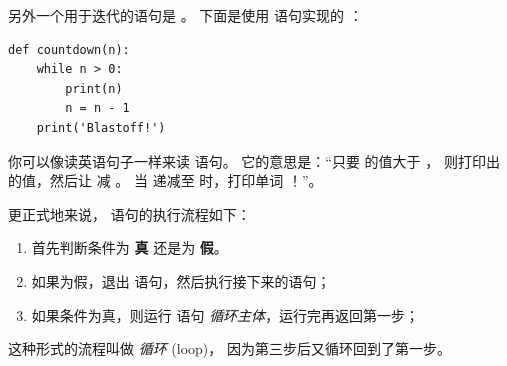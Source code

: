 另外一个用于迭代的语句是  。 下面是使用  语句实现的 ：

\begin{lstlisting}
def countdown(n):
    while n > 0:
        print(n)
        n = n - 1
    print('Blastoff!')
\end{lstlisting}

%

你可以像读英语句子一样来读  语句。 它的意思是：``只要  的值大于 ， 则打印出  的值，然后让  减 。 当  递减至  时，打印单词 ！''。


更正式地来说， 语句的执行流程如下：


\begin{enumerate}

\item 首先判断条件为 {\bf 真} 还是为 {\bf 假}。

\item 如果为假，退出  语句，然后执行接下来的语句；

\item 如果条件为真，则运行  语句 {\em 循环主体}，运行完再返回第一步；

\end{enumerate}

    

这种形式的流程叫做 {\em 循环} (loop)， 因为第三步后又循环回到了第一步。
    

